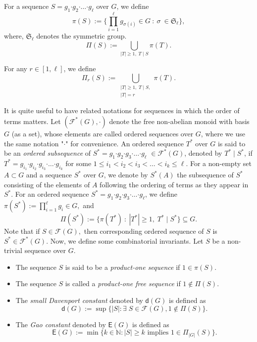 \documentclass[a4paper,11pt]{article}
\numberwithin{equation}{section}
\newcommand{\bdot}{\boldsymbol{\cdot}}
\newcommand{\no}{\noindent}
\begin{document}
\noindent For a sequence $S=g_1\bdot g_2\bdot \dotsc \bdot g_{\ell}$ over $G$, we define 
\[
\pi(S) := \bigg\{ \prod_{i=1}^{\ell}g_{\sigma(i)} \in G ~:~ \sigma ~ \in \mathfrak{S}_{\ell} \bigg\},
\] 
where, $\mathfrak{S}_{\ell}$ denotes the symmetric group. 
\[  
\Pi(S) := \bigcup_{ |T| \ge 1,\; T \mid S}  \pi(T).
\]

\no For any $r \in [1,\ell]$, we define
\[  
\Pi_r(S) := \bigcup_{\substack{|T|\ge 1,\; T \mid S,\\ |T|=r}}  \pi(T).
\]

\noindent 
It is quite useful to have related notations for sequences in which the order of terms matters. 
 Let $(\mathcal{F}^{\ast}(G), \bdot)$ denote the free non-abelian monoid with basis $G$ (as a set), whose elements are called ordered sequences over $G$, where we use the same notation "$\bdot$" for convenience. An ordered sequence $T^{\ast}$ over $G$ is said to be an {\it ordered subsequence} of $S^{\ast}=g_1\bdot g_2 \bdot g_3 \bdot \dots \bdot g_{\ell}$ $\in \mathcal{F}^{\ast}(G)$, denoted by $T^{\ast} \mid S^{\ast}$, if $T^{\ast}=g_{i_1}\bdot g_{i_2} \bdot g_{i_3} \bdot \dotsc \bdot g_{i_k}$ for some $1\le i_1<i_2<i_3 < \dots <i_k\le \ell$. 
 For a non-empty set $A\subset G$ and a sequence $S^{\ast}$ over $G$, we denote by $S^{\ast}(A)$ the subsequence of $S^{\ast}$ consisting of the elements of $A$ following the ordering of terms as they appear in $S^{\ast}.$
 For an ordered sequence $S^{\ast}=g_1\bdot g_2 \bdot g_3 \bdot \dots \bdot g_{\ell}$, we define $\pi(S^{\ast}) := \prod_{i=1}^{\ell}g_{i} \in G,
$
and 
\begin{equation*}
\Pi(S^{\ast}) :=\big\{ \pi(T^{\ast}) ~:~  |T^{\ast}|\ge 1,\; T^{\ast} \mid S^{\ast} \big\} \subseteq G.
\end{equation*}
Note that if $S \in \mathcal{F}(G),$ then corresponding ordered sequence of $S$ is $S^{\ast} \in \mathcal{F}^{\ast}(G).$
Now, we define some combinatorial invariants. Let $S$ be a non-trivial sequence over $G$.
\begin{itemize}
    \item The sequence $S$ is said to be a {\it product-one sequence} if $1 \in \pi(S)$.
    \item The sequence $S$ is called a {\it product-one free sequence} if  $1\not\in \Pi(S)$.
    \item The {\it small Davenport constant} denoted by $\mathsf{d}(G)$ is defined as $$\mathsf{d}(G):= \sup\big\{|S| : \exists\; S\in {\mathcal{F}}(G), 1\notin \Pi(S) \big\}.$$
    \item The {\it Gao constant} denoted by $\mathsf{E}(G)$ is defined as 
    $$\mathsf{E}(G):= \min\big\{k\in \mathbb{N} : |S| \ge k \text{ implies } 1\in \Pi_{|G|}(S) \big\}.$$
\end{itemize}
\end{document}
